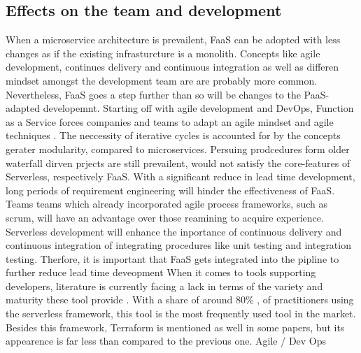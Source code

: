 \documentclass[11pt]{article}
\begin{document}
\subsection{Effects on the team and development}
When a microservice architecture is prevailent, FaaS can be adopted with less changes as if the existing infrasturcture is a monolith. Concepts like agile development, continues delivery and continuous integration as well as differen mindset amongst the development team are are probably more common. Nevertheless, FaaS goes a step further than so will be changes to the PaaS-adapted developemnt. Starting off with agile development and \glqq DevOps\grqq{}, Function as a Service forces companies and teams to adapt an agile mindset and agile techniques \cite{benlian2018transformative}. The neccessity of iterative cycles is accounted for by the concepts gerater modularity, compared to microservices. Persuing prodcedures form older waterfall dirven prjects are still prevailent, would not satisfy the core-features of Serverless, respectively FaaS. With a significant reduce in lead time development, long periods of requirement engineering will hinder the effectiveness of FaaS. Teams teams which already incorporated agile process frameworks, such as scrum, will have an advantage over those reamining to acquire experience. Serverless development will enhance the inportance of continuous delivery and continuous integration of integrating procedures like unit testing and integration testing. Therfore, it is important that FaaS gets integrated into the pipline to further reduce lead time deveopment
When it comes to tools supporting developers, literature is currently facing a lack in terms of the variety and maturity these tool provide \cite{Yussupov2019_SystematicMappingStudyFaaS}. With a share of around 80\% \cite{leitner2019mixed}, of practitioners using the serverless framework, this tool is the most frequently used tool in the market. Besides this framework, Terraform is mentioned as well in some papers, but its appearence is far less than compared to the previous one. 
Agile  / Dev Ops
\end{document}
